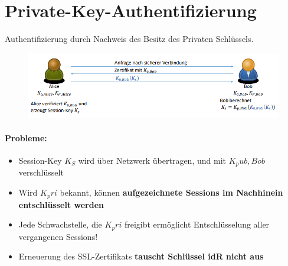 \section{Private-Key-Authentifizierung}
Authentifizierung durch Nachweis des Besitz des Privaten Schlüssels.
\begin{figure}[H]
	\begin{center}
		\includegraphics[scale=0.8]{Resources/PrivateKeyAuth.png}
		\caption{}
		\label{fig:PrivateKeyAuth.png}
	\end{center}
\end{figure}
\paragraph{Probleme:}
\begin{itemize}
	\item Session-Key $K_S$ wird über Netzwerk übertragen, und mit $K_pub, Bob$ verschlüsselt
	\item Wird $K_pri$ bekannt, können \textbf{aufgezeichnete Sessions im Nachhinein entschlüsselt werden}
	\item Jede Schwachstelle, die $K_pri$ freigibt ermöglicht Entschlüsselung aller vergangenen Sessions!
	\item Erneuerung des SSL-Zertifikats \textbf{tauscht Schlüssel idR nicht aus}
\end{itemize}

